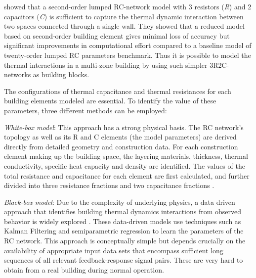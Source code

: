 \cite{gouda2002building} showed that a second-order lumped RC-network model with 3 resistors (\textsl{R}) and 2 capacitors (\textsl{C}) is sufficient to capture the thermal dynamic interaction between two spaces connected through a single wall. 
They showed that a reduced model based on second-order building element gives minimal loss of accuracy but significant improvements in computational effort compared to a baseline model of twenty-order lumped RC parameters benchmark. 
Thus it is possible to model the thermal interactions in a multi-zone building by using such simpler 3R2C-networks as building blocks. 

%

The configurations of thermal capacitance and thermal resistances for each building elements modeled are essential. To identify the value of these parameters, three different methods can be employed:

\emph{White-box model}: This approach has a strong physical basis. The RC network's topology as well as its R and C elements (the model parameters) are derived directly from detailed geometry and construction data. For each construction element making up the building space, the layering materials, thickness, thermal conductivity, specific heat capacity and density are identified. The values of the total resistance and capacitance for each element are first calculated, and further divided into three resistance fractions and two capacitance fractions \citep{gouda2000low,gouda2002building,deng2010building,dobbs2012automatic,goyal2012method,sturzenegger2012semi,sturzenegger2014brcm}.

\emph{Black-box model}: Due to the complexity of underlying physics, a data driven approach that identifies building thermal dynamics  interactions from observed behavior is widely explored \citep{goyal2011identification,cigler2013beyond,zhou2016quantitative}. These data-driven models use techniques such as Kalman Filtering and semiparametric regression to learn the parameters of the RC network. This approach is conceptually simple but depends crucially on the availability of appropriate input data sets that encompass sufficient long sequences of all relevant feedback-response signal pairs. These are very hard to obtain from a real building during normal operation.

